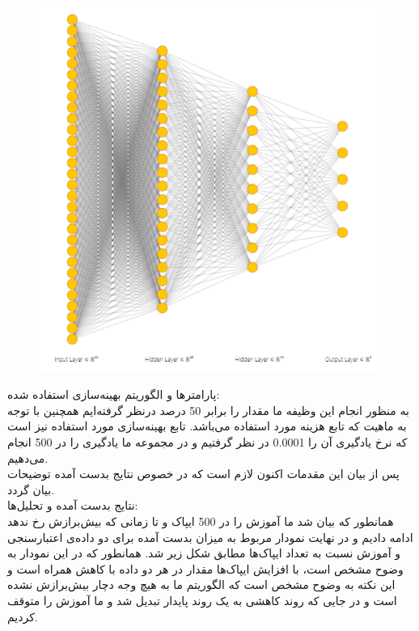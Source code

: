 \documentclass[10pt,onecolumn,a4paper]{article}
\begin{document}
\begin{figure}[h!]
        \centering
        \includegraphics[scale=0.55]{b.png}
        \caption{  }  
    \end{figure}


	پارامترها و الگوریتم بهینه‌سازی استفاده شده:\\

به منظور انجام این وظیفه ما مقدار   را برابر 50 درصد درنظر گرفته‌ایم  همچنین با توجه به ماهیت که تابع هزینه مورد استفاده   می‌باشد. تابع بهینه‌سازی مورد استفاده نیز  است که نرخ یادگیری آن را 0.0001 در نظر گرفتیم و در مجموعه ما یادگیری را در 500  انجام می‌دهیم.\\
پس از بیان این مقدمات اکنون لازم است که در خصوص نتایج بدست آمده توضیحات بیان گردد.\\
	نتایج بدست آمده و تحلیل‌ها:\\

همانطور که بیان شد ما آموزش را در 500 ایپاک و تا زمانی که بیش‌برازش رخ ندهد ادامه دادیم و در نهایت نمودار مربوط به میزان  بدست آمده برای دو داده‌ی اعتبارسنجی و آموزش نسبت به تعداد ایپاک‌ها مطابق شکل زیر شد. همانطور که در این نمودار به وضوح مشخص است، با افزایش ایپاک‌ها مقدار  در هر دو داده‌ با کاهش همراه است و این نکته به وضوح مشخص است که الگوریتم ما به هیچ وجه دچار بیش‌برازش نشده است و در جایی که روند کاهشی به یک روند پایدار تبدیل شد و ما آموزش را متوقف کردیم. \\
  
\end{document}
